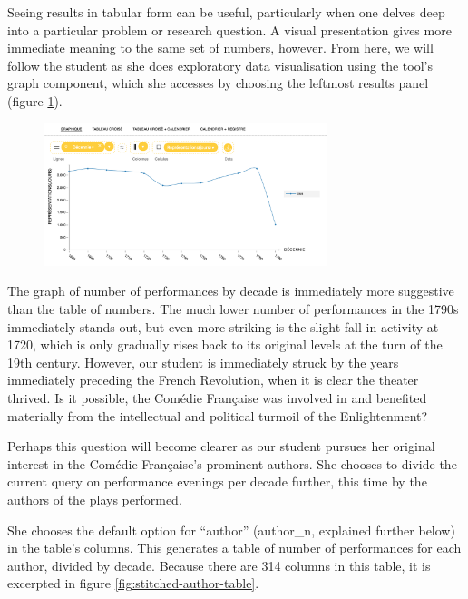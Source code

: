 \documentclass[	DIV=calc,%
							paper=a4,%
							fontsize=11pt,%
							twocolumn]{scrartcl}	 					%
\begin{document}
Seeing results in tabular form can be useful, particularly when one delves deep into a particular problem or research question.  A visual presentation gives more immediate meaning to the same set of numbers, however.  From here, we will follow the student as she does exploratory data visualisation using the tool’s graph component, which she accesses by choosing the leftmost results panel (figure \ref{fig:performances_by_decade_graph}).

\begin{figure}
  \centering
	\includegraphics[width=3.25in]{steps/performances_by_decade_graph.png}
	\caption{}
	\label{fig:performances_by_decade_graph}
\end{figure}

The graph of number of performances by decade is immediately more suggestive than the table of numbers.  The much lower number of performances in the 1790s immediately stands out, but even more striking is the slight fall in activity at 1720, which is only gradually rises back to its original levels at the turn of the 19th century.  However, our student is immediately struck by the years immediately preceding the French Revolution, when it is clear the theater thrived.  Is it possible, the Comédie Française was involved in and benefited materially from the intellectual and political turmoil of the Enlightenment?

Perhaps this question will become clearer as our student pursues her original interest in the Comédie Française’s prominent authors.  She chooses to divide the current query on performance evenings per decade further, this time by the authors of the plays performed.

She chooses the default option for ``author'' (author\_n, explained further below) in the table’s columns.  This generates a table of number of performances for each author, divided by decade.  Because there are 314 columns in this table, it is excerpted in figure \ref{fig:stitched-author-table}.
\end{document}
